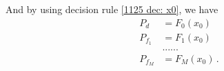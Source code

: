   And by  using decision rule \eqref{1125 dec: x0}, we have
  \begin{equation}
	\begin{split}
	  \label{equ: pd under x00}
	  P_d &=  F_0(x_0)\\
	  P_{f_1} &=  F_1(x_0)\\
	  &......\\
	  P_{f_M} &= F_M(x_0)\,.
	\end{split}
  \end{equation}
  \typeout{}
  

  \typeout{}
  
